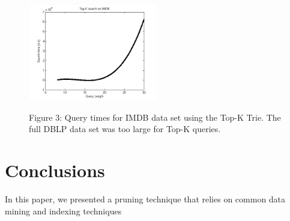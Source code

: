 \documentclass[pdftex,12pt,letter]{article}
\begin{document}
\begin{figure}[h!]
\centering
\includegraphics[width=0.5\textwidth]{TOPKonIMDB.jpg}
\begin{center}
Figure 3: Query times for IMDB data set using the Top-K Trie. The full DBLP data set was too large for Top-K queries.
\end{center}
\end{figure}


\section{Conclusions}
In this paper, we presented a pruning technique that relies on common data mining and indexing techniques




\FloatBarrier
\end{document}
